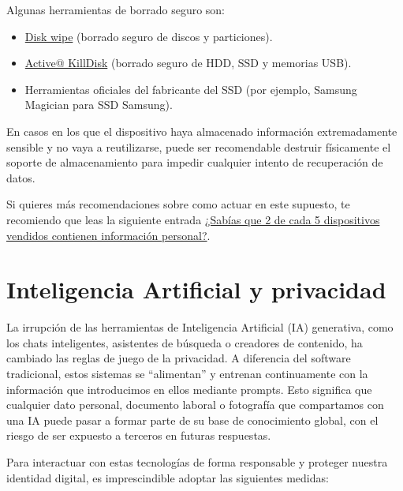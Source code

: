 \documentclass[
  spanish,
  a4paper,
  openany]{book}
\begin{document}
Algunas herramientas de borrado seguro son:

\begin{itemize}
\item
  \href{https://www.diskwipe.org/download.php}{Disk wipe} (borrado seguro de discos y particiones).
\item
  \href{https://www.killdisk.com/eraser.html}{Active@ KillDisk} (borrado seguro de HDD, SSD y memorias USB).
\item
  Herramientas oficiales del fabricante del SSD (por ejemplo, Samsung Magician para SSD Samsung).
\end{itemize}

En casos en los que el dispositivo haya almacenado información extremadamente sensible y no vaya a reutilizarse, puede ser recomendable destruir físicamente el soporte de almacenamiento para impedir cualquier intento de recuperación de datos.

Si quieres más recomendaciones sobre como actuar en este supuesto, te recomiendo que leas la siguiente entrada \href{https://www.osi.es/es/actualidad/blog/2019/10/09/sabias-que-2-de-cada-5-dispositivos-vendidos-contienen-informacion}{¿Sabías que 2 de cada 5 dispositivos vendidos contienen información personal?}.

\section{Inteligencia Artificial y privacidad}\label{inteligencia-artificial-y-privacidad}

La irrupción de las herramientas de Inteligencia Artificial (IA) generativa, como los chats inteligentes, asistentes de búsqueda o creadores de contenido, ha cambiado las reglas de juego de la privacidad. A diferencia del software tradicional, estos sistemas se ``alimentan'' y entrenan continuamente con la información que introducimos en ellos mediante prompts. Esto significa que cualquier dato personal, documento laboral o fotografía que compartamos con una IA puede pasar a formar parte de su base de conocimiento global, con el riesgo de ser expuesto a terceros en futuras respuestas.

Para interactuar con estas tecnologías de forma responsable y proteger nuestra identidad digital, es imprescindible adoptar las siguientes medidas:
\end{document}
